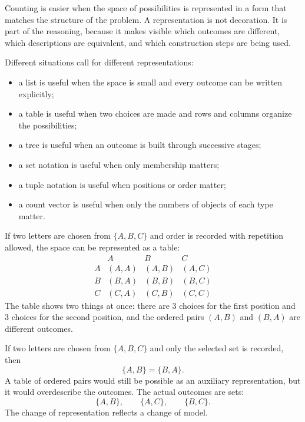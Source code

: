 Counting is easier when the space of possibilities is represented in a form that matches the structure of the problem. A representation is not decoration. It is part of the reasoning, because it makes visible which outcomes are different, which descriptions are equivalent, and which construction steps are being used.

Different situations call for different representations:
\begin{itemize}
    \item a list is useful when the space is small and every outcome can be written explicitly;
    \item a table is useful when two choices are made and rows and columns organize the possibilities;
    \item a tree is useful when an outcome is built through successive stages;
    \item a set notation is useful when only membership matters;
    \item a tuple notation is useful when positions or order matter;
    \item a count vector is useful when only the numbers of objects of each type matter.
\end{itemize}

\begin{examplebox}
If two letters are chosen from \(\{A,B,C\}\) and order is recorded with repetition allowed, the space can be represented as a table:
\[
\begin{array}{c|ccc}
 & A & B & C \\
\hline
A & (A,A) & (A,B) & (A,C) \\
B & (B,A) & (B,B) & (B,C) \\
C & (C,A) & (C,B) & (C,C)
\end{array}
\]
The table shows two things at once: there are \(3\) choices for the first position and \(3\) choices for the second position, and the ordered pairs \((A,B)\) and \((B,A)\) are different outcomes.
\end{examplebox}

\begin{examplebox}
If two letters are chosen from \(\{A,B,C\}\) and only the selected set is recorded, then
\[
\{A,B\}=\{B,A\}.
\]
A table of ordered pairs would still be possible as an auxiliary representation, but it would overdescribe the outcomes. The actual outcomes are sets:
\[
\{A,B\},\qquad \{A,C\},\qquad \{B,C\}.
\]
The change of representation reflects a change of model.
\end{examplebox}

